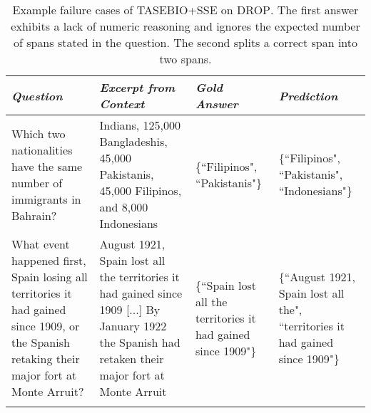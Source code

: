 \documentclass[11pt,a4paper]{article}
\newcommand{\drop}{\textsc{DROP}}
\begin{document}
\begin{table*}[ht]
\centering
\footnotesize
\begin{tabular}{@{}p{4.5cm} p{5cm} p{2.2cm} p{2.8cm} @{} }
\toprule
\emph{\textbf{Question}} & \emph{\textbf{Excerpt from Context}} & \emph{\textbf{Gold Answer}} & \emph{\textbf{Prediction}}  \\ \midrule 
\addlinespace

Which two nationalities have the same number of immigrants in Bahrain? &
Indians, 125,000 Bangladeshis, 45,000 Pakistanis, 45,000 Filipinos, and 8,000 Indonesians &
\{``Filipinos", \newline ``Pakistanis"\} &
\{``Filipinos", \newline ``Pakistanis", \newline ``Indonesians"\}
\\ \addlinespace \midrule \addlinespace

What event happened first, Spain losing all territories it had gained since 1909, or the Spanish retaking their major fort at Monte Arruit? &
August 1921, Spain lost all the territories it had gained since 1909 [...] By January 1922 the Spanish had retaken their major fort at Monte Arruit &
\{``Spain lost all the territories it had gained since 1909"\} &
\{``August 1921, Spain lost all the", ``territories it had gained since 1909"\}
\\\addlinespace \bottomrule
\end{tabular}
\caption{Example failure cases of TASE{\scriptsize BIO}+SSE on \drop{}. The first answer exhibits a lack of numeric reasoning and ignores the expected number of spans stated in the question. The second splits a correct span into two spans.}
\label{tab:failurecases}
\end{table*}
 

\end{document}
